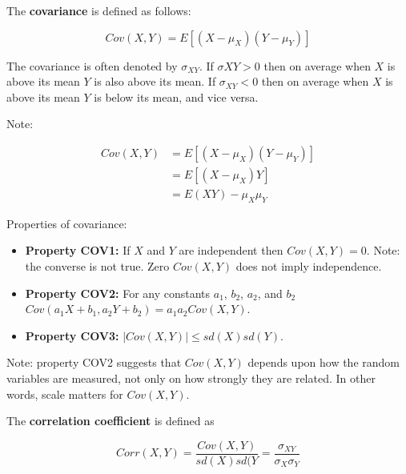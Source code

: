 \documentclass[11pt]{article}
\begin{document}
\vspace{2mm}

The \textbf{covariance} is defined as follows:

\begin{equation*}
Cov(X,Y) = E[(X-\mu_{X})(Y - \mu_{Y})]
\end{equation*}

The covariance is often denoted by $\sigma_{XY}$. If $\sigma{XY} > 0$ then on average when $X$ is above its mean $Y$
is also above its mean. If $\sigma_{XY} < 0$ then on average when $X$ is above its mean $Y$ is below its mean, and vice
versa.

\vspace{2mm}

Note: 

\begin{align*}
Cov(X,Y) &= E[(X - \mu_{X})(Y - \mu_{Y})] \\
         &= E[(X - \mu_{X}) Y]            \\
         &= E(XY) - \mu_{X}\mu_{Y}
\end{align*}


\vspace{2mm}

\newpage
Properties of covariance:

\begin{itemize}
 \item[] \textbf{Property COV1:} If $X$ and $Y$ are independent then $Cov(X,Y) = 0$. Note: the converse
         is not true. Zero $Cov(X, Y)$ does not imply independence.
 \item[] \textbf{Property COV2:} For any constants $a_{1}$, $b_{2}$, $a_{2}$, and $b_{2}$ 
         $Cov(a_{1}X + b_{1}, a_{2}Y + b_{2}) = a_{1}a_{2}Cov(X,Y)$.
 \item[] \textbf{Property COV3:} $|Cov(X,Y)| \leq sd(X)sd(Y)$.
\end{itemize}

\vspace{2mm}

Note: property COV2 suggests that  $Cov(X,Y)$ depends upon how the random variables are measured, not only
on how strongly they are related. In other words, scale matters for $Cov(X,Y)$.

\vspace{2mm}

The \textbf{correlation coefficient} is defined as 

\begin{equation*}
Corr(X,Y) = \frac{Cov(X,Y)}{sd(X)sd(Y} = \frac{\sigma_{XY}}{\sigma_{X}\sigma_{Y}}
\end{equation*}
\end{document}
